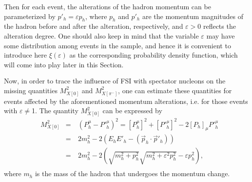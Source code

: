 Then for each event, the alterations of the hadron momentum can be parameterized by $p'_{h} = \varepsilon p_{h}$, where $p_{h}$ and $p'_{h}$ are the momentum magnitudes of the hadron before and after the alteration, respectively, and $\varepsilon >0$ reflects the alteration degree. One should also keep in mind that the variable $\varepsilon$ may have some distribution among events in the sample, and hence it is convenient to introduce here $\xi(\varepsilon)$ as the corresponding probability density function, which will come into play later in this Section.


Now, in order to trace the influence of FSI with spectator nucleons on the missing quantities $M_{X[0]}^{2}$ and $M_{X[\pi^{-}]}^{2}$, one can estimate these quantities for events affected by the aforementioned momentum alterations, i.e. for those events with $\varepsilon \neq $1. The quantity $M_{X[0]}^{2}$ can be expressed by\vspace{-0.69em}
\begin{equation}
\begin{aligned}
&M_{X[0]}^{2}&=&~(P^{\mu}_{h} -P'^{\mu}_{h})^{2} = [P^{\mu}_{h}]^{2} +\left [P'^{\mu}_{h}\right ]^{2}-2[P_{h}]_{\mu} P'^{\mu}_{h} \\
&&=&~2m^{2}_{h}-2 \left (E_{h}E'_{h} - (\overrightarrow{p}_{h}\cdot \overrightarrow{p}'_{h}) \right )\\
&&=&~2m^{2}_{h} - 2\left (\sqrt{m^{2}_{h}+p^{2}_{h}}\sqrt{m^{2}_{h}+\varepsilon^{2}p^{2}_{h}}-\varepsilon p^{2}_{h}\right ),\\[-7pt]
\end{aligned}\label{eq:mm0_fsi}
\end{equation}
where $m_{h}$ is the mass of the hadron that undergoes the momentum change.


\newpage

